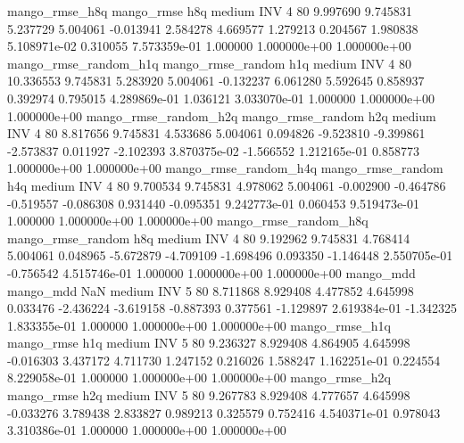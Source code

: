        mango_rmse_h8q        mango_rmse                  h8q     medium      INV                 4 80  9.997690       9.745831 5.237729       5.004061   -0.013941      2.584278      4.669577     1.279213       0.204567  1.980838 5.108971e-02     0.310055   7.573359e-01            1.000000    1.000000e+00        1.000000e+00
mango_rmse_random_h1q mango_rmse_random                  h1q     medium      INV                 4 80 10.336553       9.745831 5.283920       5.004061   -0.132237      6.061280      5.592645     0.858937       0.392974  0.795015 4.289869e-01     1.036121   3.033070e-01            1.000000    1.000000e+00        1.000000e+00
mango_rmse_random_h2q mango_rmse_random                  h2q     medium      INV                 4 80  8.817656       9.745831 4.533686       5.004061    0.094826     -9.523810     -9.399861    -2.573837       0.011927 -2.102393 3.870375e-02    -1.566552   1.212165e-01            0.858773    1.000000e+00        1.000000e+00
mango_rmse_random_h4q mango_rmse_random                  h4q     medium      INV                 4 80  9.700534       9.745831 4.978062       5.004061   -0.002900     -0.464786     -0.519557    -0.086308       0.931440 -0.095351 9.242773e-01     0.060453   9.519473e-01            1.000000    1.000000e+00        1.000000e+00
mango_rmse_random_h8q mango_rmse_random                  h8q     medium      INV                 4 80  9.192962       9.745831 4.768414       5.004061    0.048965     -5.672879     -4.709109    -1.698496       0.093350 -1.146448 2.550705e-01    -0.756542   4.515746e-01            1.000000    1.000000e+00        1.000000e+00
            mango_mdd         mango_mdd                  NaN     medium      INV                 5 80  8.711868       8.929408 4.477852       4.645998    0.033476     -2.436224     -3.619158    -0.887393       0.377561 -1.129897 2.619384e-01    -1.342325   1.833355e-01            1.000000    1.000000e+00        1.000000e+00
       mango_rmse_h1q        mango_rmse                  h1q     medium      INV                 5 80  9.236327       8.929408 4.864905       4.645998   -0.016303      3.437172      4.711730     1.247152       0.216026  1.588247 1.162251e-01     0.224554   8.229058e-01            1.000000    1.000000e+00        1.000000e+00
       mango_rmse_h2q        mango_rmse                  h2q     medium      INV                 5 80  9.267783       8.929408 4.777657       4.645998   -0.033276      3.789438      2.833827     0.989213       0.325579  0.752416 4.540371e-01     0.978043   3.310386e-01            1.000000    1.000000e+00        1.000000e+00
